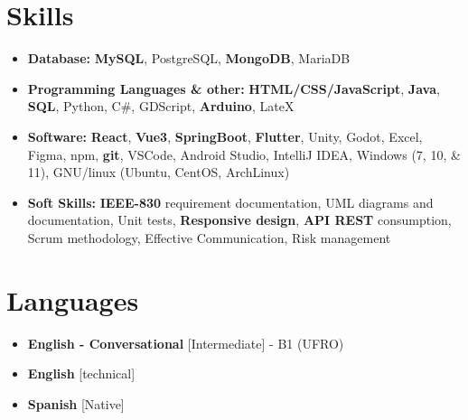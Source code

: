 \documentclass[11pt,a4paper,sans]{moderncv}
\newcommand{\sectionMargin}{-3mm}
\begin{document}
\section{Skills}{
\begin{itemize}[label=\textbullet]
    \item {\textbf{Database:} 
        \textbf{MySQL}, 
        PostgreSQL, 
        \textbf{MongoDB}, 
        MariaDB
    }
    \item {\textbf{Programming Languages \& other:} 
        \textbf{HTML/CSS/JavaScript},
        \textbf{Java},
        \textbf{SQL},
        Python, 
        C\#, 
        GDScript,
        \textbf{Arduino},
        LateX
    }
    \item {\textbf{Software:} 
        \textbf{React},
        \textbf{Vue3},
        \textbf{SpringBoot},
        \textbf{Flutter},
        Unity,
        Godot,
        Excel,
        Figma,
        npm,
        \textbf{git},
        VSCode,
        Android Studio,
        IntelliJ IDEA,
        Windows (7, 10, \& 11),
        GNU/linux (Ubuntu, CentOS, ArchLinux)
    }
    \item {\textbf{Soft Skills:}
        \textbf{IEEE-830} requirement documentation,
        UML diagrams and documentation,
        Unit tests,
        \textbf{Responsive design},
        \textbf{API REST} consumption,
        Scrum methodology,
        Effective Communication, 
        Risk management
    }
\end{itemize}}

\vspace*{\sectionMargin}

\section{Languages}
\begin{multicols}{2}
    \begin{itemize}[label=\textbullet]
        \item \textbf{English - Conversational} [Intermediate] - B1 (UFRO)
        \item \textbf{English} [technical]
        \item \textbf{Spanish} [Native]
    \end{itemize}
\end{multicols}
\end{document}
